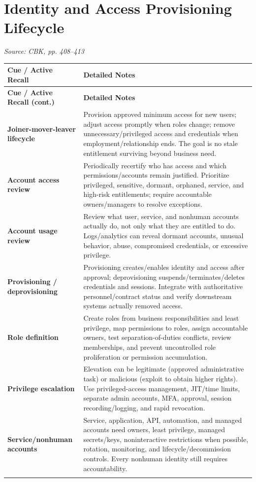 \documentclass[10pt,letterpaper]{article}
\makeatletter
\newenvironment{cornell}{\rowcolors{2}{white}{notebg}\begin{longtable}{@{}>{\raggedright\arraybackslash\columncolor{cuebg}\color{navy}\bfseries}p{0.285\textwidth}>{\raggedright\arraybackslash}p{0.65\textwidth}@{}}\rowcolor{navy}\color{white}\textbf{Cue / Active Recall} & \color{white}\textbf{Detailed Notes}\\ \hline\endfirsthead\rowcolor{navy}\color{white}\textbf{Cue / Active Recall (cont.)} & \color{white}\textbf{Detailed Notes}\\ \hline\endhead}{\end{longtable}}
\newcommand{\noterow}[2]{#1 & #2\\\arrayrulecolor{line}\hline}\newcommand{\source}[1]{\par{\footnotesize\color{teal}\textit{Source: CBK, #1}}\par}
\makeatother
\begin{document}
\section{\color{navy}Identity and Access Provisioning Lifecycle}
\source{pp. 408--413}
\begin{cornell}
\noterow{Joiner-mover-leaver lifecycle}{Provision approved minimum access for new users; adjust access promptly when roles change; remove unnecessary/privileged access and credentials when employment/relationship ends. The goal is no stale entitlement surviving beyond business need.}
\noterow{Account access review}{Periodically recertify who has access and which permissions/accounts remain justified. Prioritize privileged, sensitive, dormant, orphaned, service, and high-risk entitlements; require accountable owners/managers to resolve exceptions.}
\noterow{Account usage review}{Review what user, service, and nonhuman accounts actually do, not only what they are entitled to do. Logs/analytics can reveal dormant accounts, unusual behavior, abuse, compromised credentials, or excessive privilege.}
\noterow{Provisioning / deprovisioning}{Provisioning creates/enables identity and access after approval; deprovisioning suspends/terminates/deletes credentials and sessions. Integrate with authoritative personnel/contract status and verify downstream systems actually removed access.}
\noterow{Role definition}{Create roles from business responsibilities and least privilege, map permissions to roles, assign accountable owners, test separation-of-duties conflicts, review memberships, and prevent uncontrolled role proliferation or permission accumulation.}
\noterow{Privilege escalation}{Elevation can be legitimate (approved administrative task) or malicious (exploit to obtain higher rights). Use privileged-access management, JIT/time limits, separate admin accounts, MFA, approval, session recording/logging, and rapid revocation.}
\noterow{Service/nonhuman accounts}{Service, application, API, automation, and managed accounts need owners, least privilege, managed secrets/keys, noninteractive restrictions when possible, rotation, monitoring, and lifecycle/decommission controls. Every nonhuman identity still requires accountability.}
\end{cornell}
\end{document}
